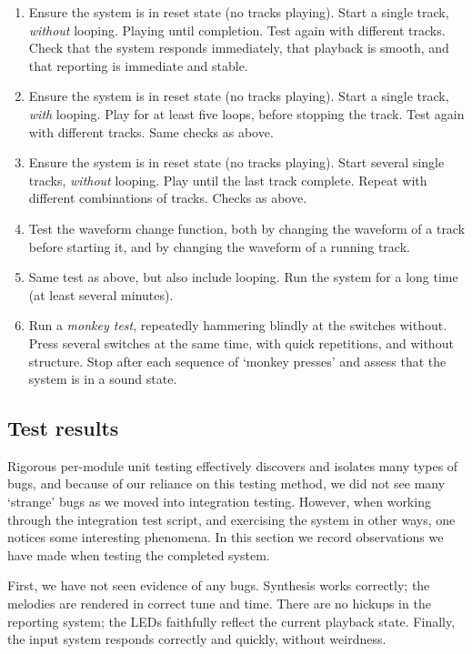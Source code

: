 \documentclass[a4paper,9pt]{article}
\begin{document}
\begin{enumerate}
    \item Ensure the system is in reset state (no tracks playing). Start a
        single track, \emph{without} looping. Playing until completion. Test
        again with different tracks. Check that the system responds
        immediately, that playback is smooth, and that reporting is immediate
        and stable.
    \item Ensure the system is in reset state (no tracks playing). Start a
        single track, \emph{with} looping. Play for at least five loops,
        before stopping the track. Test again with different tracks. Same
        checks as above.
    \item Ensure the system is in reset state (no tracks playing). Start 
        several single tracks, \emph{without} looping. Play until the last
        track complete. Repeat with different combinations of tracks.  Checks
        as above.
    \item Test the waveform change function, both by changing the waveform of
        a track before starting it, and by changing the waveform of a running
        track.
    \item Same test as above, but also include looping. Run the system for a
        long time (at least several minutes). 
    \item Run a \emph{monkey test}, repeatedly hammering blindly at the
        switches without. Press several switches at the same time, with quick
        repetitions, and without structure. Stop after each sequence of
        `monkey presses' and assess that the system is in a sound state.
\end{enumerate}

\subsection{Test results}
Rigorous per-module unit testing effectively discovers and isolates many types
of bugs, and because of our reliance on this testing method, we did not see
many `strange' bugs as we moved into integration testing. However, when
working through the integration test script, and exercising the system in
other ways, one notices some interesting phenomena. In this section we record
observations we have made when testing the completed system.

First, we have not seen evidence of any bugs. Synthesis works correctly; the
melodies are rendered in correct tune and time.  There are no hickups in the
reporting system; the LEDs faithfully reflect the current playback state.
Finally, the input system responds correctly and quickly, without weirdness.
\end{document}
